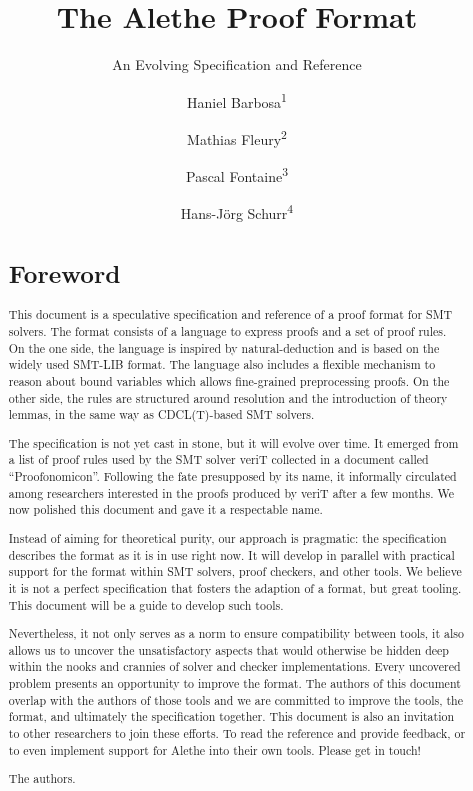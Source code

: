 \documentclass{scrartcl}
\title{The Alethe Proof Format}
\subtitle{An Evolving Specification and Reference}
\author{Haniel Barbosa\textsuperscript{1}
\and Mathias Fleury\textsuperscript{2}
\and Pascal Fontaine\textsuperscript{3}
\and Hans-Jörg Schurr\textsuperscript{4}}
\date{}
\theoremstyle{definition}
\begin{document}
\maketitle
\tableofcontents
\thispagestyle{empty}
\clearpage

\begin{abstract}
\section*{Foreword}
This document is a speculative specification and reference of a proof
format for SMT solvers.  The format consists of a language to express
proofs and a set of proof rules.  On the one side, the language is
inspired by natural-deduction and is based on the widely used SMT-LIB
format.  The language also includes a flexible mechanism to reason
about bound variables which allows fine-grained preprocessing proofs.
%
On the other side, the rules are structured around resolution and the
introduction of theory lemmas, in the same way as CDCL(T)-based SMT
solvers.

The specification is not yet
cast in stone, but it will evolve over time. It emerged from a list
of proof rules used by the SMT solver veriT collected in a document
called ``Proofonomicon''. Following the fate presupposed by its name,
it informally circulated among researchers interested in the proofs
produced by veriT after a few months.  We now polished this document
and gave it a respectable name.

Instead of aiming for theoretical purity, our approach
is pragmatic: the specification describes the format as it is in use
right now. It will develop in parallel with practical support for the
format within SMT solvers, proof checkers, and other tools.  We believe
it is not a perfect specification that fosters the adaption of a format,
but great tooling. This document will be a guide to develop
such tools.

Nevertheless, it not only serves as a norm to ensure compatibility
between tools, it also allows us to uncover the unsatisfactory aspects
that would otherwise be hidden deep within the nooks and crannies of
solver and checker implementations.
%
Every uncovered problem presents an opportunity
to improve the format. The authors of this document overlap with the
authors of those tools and we are committed to improve the tools, the
format, and ultimately the specification together.
This document is also an invitation to other researchers to join
these efforts. To read the reference and provide feedback, or to even
implement support for Alethe into their own tools. Please
get in touch!

\bigskip
\hspace*{\fill}The authors.
\end{abstract}
\end{document}
